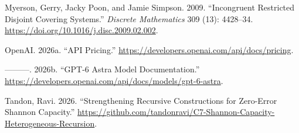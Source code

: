 \documentclass[11pt,a4paper]{article}
\newenvironment{CSLReferences}[2]{\begingroup\small\raggedright\setlength{\parskip}{0.5em}\setlength{\parindent}{0pt}}{\endgroup}
\begin{document}
\begin{CSLReferences}{1}{0}
\leavevmode{}%
Myerson, Gerry, Jacky Poon, and Jamie Simpson. 2009. {``Incongruent
Restricted Disjoint Covering Systems.''} \emph{Discrete Mathematics} 309
(13): 4428--34. \url{https://doi.org/10.1016/j.disc.2009.02.002}.

\leavevmode{}%
OpenAI. 2026a. {``API Pricing.''}
\url{https://developers.openai.com/api/docs/pricing}.

\leavevmode{}%
---------. 2026b. {``{GPT-6 Astra} Model Documentation.''}
\url{https://developers.openai.com/api/docs/models/gpt-6-astra}.

\leavevmode{}%
Tandon, Ravi. 2026. {``Strengthening Recursive Constructions for
Zero-Error Shannon Capacity.''}
\url{https://github.com/tandonravi/C7-Shannon-Capacity-Heterogeneous-Recursion}.

\end{CSLReferences}
\end{document}
